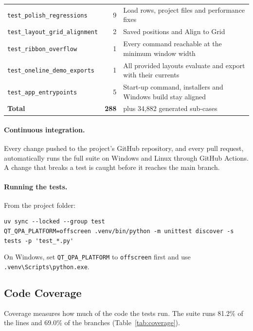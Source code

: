 \begin{table}[H]
\begin{tabularx}{\textwidth}{l r L}
    \texttt{test\_polish\_regressions} & 9 & Load rows, project files and performance fixes \\
    \texttt{test\_layout\_grid\_alignment} & 2 & Saved positions and Align to Grid \\
    \texttt{test\_ribbon\_overflow} & 1 & Every command reachable at the minimum window width \\
    \texttt{test\_oneline\_demo\_exports} & 1 & All provided layouts evaluate and export with their currents \\
    \texttt{test\_app\_entrypoints} & 5 & Start-up command, installers and Windows build stay aligned \\
    \midrule
    \textbf{Total} & \textbf{288} & plus 34{,}882 generated sub-cases \\
    \bottomrule
  \end{tabularx}
\end{table}

\paragraph{Continuous integration.} Every change pushed to the project's GitHub
repository, and every pull request, automatically runs the full suite on Windows and
Linux through GitHub Actions. A change that breaks a test is caught before it reaches
the main branch.

\paragraph{Running the tests.} From the project folder:
\begin{lstlisting}
uv sync --locked --group test
QT_QPA_PLATFORM=offscreen .venv/bin/python -m unittest discover -s tests -p 'test_*.py'
\end{lstlisting}
On Windows, set \texttt{QT\_QPA\_PLATFORM} to \texttt{offscreen} first and use
\texttt{.venv\textbackslash Scripts\textbackslash python.exe}.

\subsection{Code Coverage}

Coverage measures how much of the code the tests run. The suite runs 81.2\% of the
lines and 69.0\% of the branches (Table~\ref{tab:coverage}).

